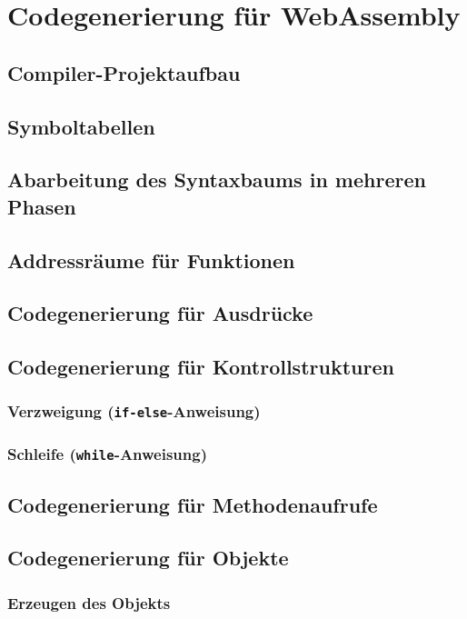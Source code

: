 \chapter{Codegenerierung für WebAssembly}

\section{Compiler-Projektaufbau}

\section{Symboltabellen}

\section{Abarbeitung des Syntaxbaums in mehreren Phasen}

\section{Addressräume für Funktionen}

\section{Codegenerierung für Ausdrücke}

\section{Codegenerierung für Kontrollstrukturen}
\subsection{Verzweigung (\lstinline{if-else}-Anweisung)}
\subsection{Schleife (\lstinline{while}-Anweisung)}

\section{Codegenerierung für Methodenaufrufe}

\section{Codegenerierung für Objekte}
\subsection{Erzeugen des Objekts}
